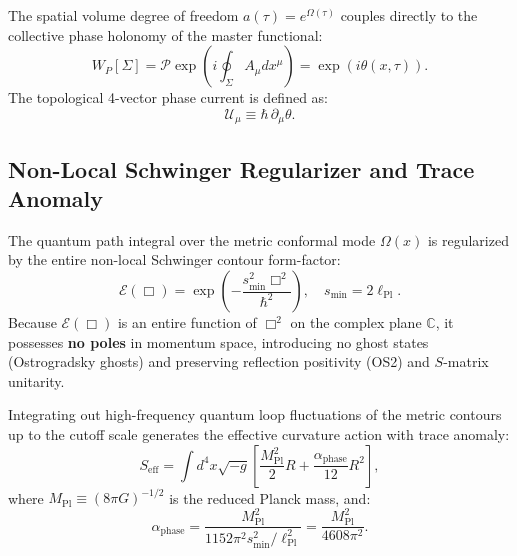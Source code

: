\documentclass[11pt,a4paper]{article}
\begin{document}
The spatial volume degree of freedom $a(\tau) = e^{\Omega(\tau)}$ couples directly to the collective phase holonomy of the master functional:
\begin{equation}
W_P[\Sigma] = \mathcal{P} \exp\left( i \oint_\Sigma A_\mu dx^\mu \right) = \exp(i \theta(x, \tau)).
\end{equation}
The topological 4-vector phase current is defined as:
\begin{equation}
\mathcal{U}_\mu \equiv \hbar \, \partial_\mu \theta.
\end{equation}

\subsection{Non-Local Schwinger Regularizer and Trace Anomaly}
The quantum path integral over the metric conformal mode $\Omega(x)$ is regularized by the entire non-local Schwinger contour form-factor:
\begin{equation}
\mathcal{E}(\Box) = \exp\left( -\frac{s_{\min}^2 \Box^2}{\hbar^2} \right), \quad s_{\min} = 2\ell_{\mathrm{Pl}}.
\end{equation}
Because $\mathcal{E}(\Box)$ is an entire function of $\Box^2$ on the complex plane $\mathbb{C}$, it possesses \textbf{no poles} in momentum space, introducing no ghost states (Ostrogradsky ghosts) and preserving reflection positivity (OS2) and $S$-matrix unitarity.

Integrating out high-frequency quantum loop fluctuations of the metric contours up to the cutoff scale generates the effective curvature action with trace anomaly:
\begin{equation}
S_{\mathrm{eff}} = \int d^4x \sqrt{-g} \left[ \frac{M_{\mathrm{Pl}}^2}{2} R + \frac{\alpha_{\mathrm{phase}}}{12} R^2 \right],
\label{eq:R2_action}
\end{equation}
where $M_{\mathrm{Pl}} \equiv (8\pi G)^{-1/2}$ is the reduced Planck mass, and:
\begin{equation}
\alpha_{\mathrm{phase}} = \frac{M_{\mathrm{Pl}}^2}{1152\pi^2 s_{\min}^2 / \ell_{\mathrm{Pl}}^2} = \frac{M_{\mathrm{Pl}}^2}{4608\pi^2}.
\end{equation}
\end{document}
